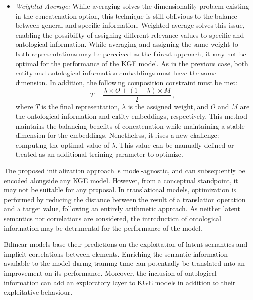 \begin{itemize}
    \item \textit{Weighted Average:} While averaging solves the dimensionality problem existing in the concatenation option, this technique is still oblivious to the balance between general and specific information. Weighted average solves this issue, enabling the possibility of assigning different relevance values to specific and ontological information. While averaging and assigning the same weight to both representations may be perceived as the fairest approach, it may not be optimal for the performance of the KGE model. As in the previous case, both entity and ontological information embeddings must have the same dimension. In addition, the following composition constraint must be met:
    \begin{equation}
        T = \frac{\lambda \times O + (1 - \lambda) \times M}{2}\,,
    \end{equation}
    where $T$ is the final representation, $\lambda$ is the assigned weight, and $O$ and $M$ are the ontological information and entity embeddings, respectively. This method maintains the balancing benefits of concatenation while maintaining a stable dimension for the embeddings. Nonetheless, it rises a new challenge: computing the optimal value of $\lambda$. This value can be manually defined or treated as an additional training parameter to optimize.
\end{itemize}

The proposed initialization approach is model-agnostic, and can subsequently be encoded alongside any KGE model. However, from a conceptual standpoint, it may not be suitable for any proposal. In translational models, optimization is performed by reducing the distance between the result of a translation operation and a target value, following an entirely arithmetic approach. As neither latent semantics nor correlations are considered, the introduction of ontological information may be detrimental for the performance of the model.

Bilinear models base their predictions on the exploitation of latent semantics and implicit correlations between elements. Enriching the semantic information available to the model during training time can potentially be translated into an improvement on its performance. Moreover, the inclusion of ontological information can add an exploratory layer to KGE models in addition to their exploitative behaviour.

